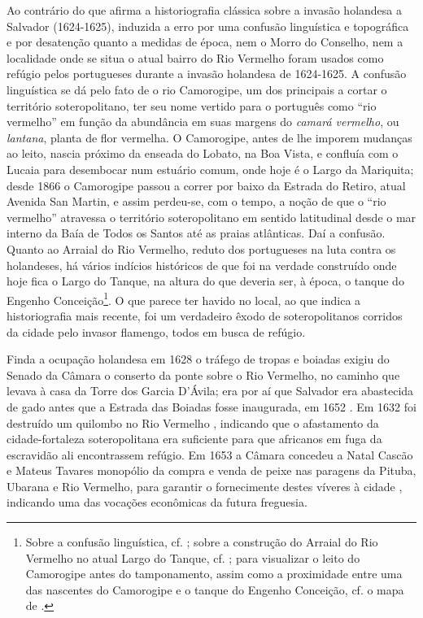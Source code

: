Ao contrário do que afirma a historiografia clássica sobre a invasão holandesa a Salvador (1624-1625), induzida a erro por uma confusão linguística e topográfica e por desatenção quanto a medidas de época, nem o Morro do Conselho, nem a localidade onde se situa o atual bairro do Rio Vermelho foram usados como refúgio pelos portugueses durante a invasão holandesa de 1624-1625. A confusão linguística se dá pelo fato de o rio Camorogipe, um dos principais a cortar o território soteropolitano, ter seu nome vertido para o português como ``rio vermelho'' em função da abundância em suas margens do \textit{camará vermelho}, ou \textit{lantana}, planta de flor vermelha. O Camorogipe, antes de lhe imporem mudanças ao leito, nascia próximo da enseada do Lobato, na Boa Vista, e confluía com o Lucaia para desembocar num estuário comum, onde hoje é o Largo da Mariquita; desde 1866 o Camorogipe passou a correr por baixo da Estrada do Retiro, atual Avenida San Martin, e assim perdeu-se, com o tempo, a noção de que o ``rio vermelho'' atravessa o território soteropolitano em sentido latitudinal desde o mar interno da Baía de Todos os Santos até as praias atlânticas. Daí a confusão. Quanto ao Arraial do Rio Vermelho, reduto dos portugueses na luta contra os holandeses, há vários indícios históricos de que foi na verdade construído onde hoje fica o Largo do Tanque, na altura do que deveria ser, à época, o tanque do Engenho Conceição\footnote{Sobre a confusão linguística, cf. ; sobre a construção do Arraial do Rio Vermelho no atual Largo do Tanque, cf. ; para visualizar o leito do Camorogipe antes do tamponamento, assim como a proximidade entre uma das nascentes do Camorogipe e o tanque do Engenho Conceição, cf. o mapa de .}. O que parece ter havido no local, ao que indica a historiografia mais recente, foi um verdadeiro êxodo de soteropolitanos corridos da cidade pelo invasor flamengo, todos em busca de refúgio.

Finda a ocupação holandesa em 1628 o tráfego de tropas e boiadas exigiu do Senado da Câmara o conserto da ponte sobre o Rio Vermelho, no caminho que levava à casa da Torre dos Garcia D'Ávila; era por aí que Salvador era abastecida de gado antes que a Estrada das Boiadas fosse inaugurada, em 1652 \cite[pp.~315-316]{azevedo_povoamento_1969}. Em 1632 foi destruído um quilombo no Rio Vermelho \cite[p.~67]{VASCONCELOS2002}, indicando que o afastamento da cidade-fortaleza soteropolitana era suficiente para que africanos em fuga da escravidão ali encontrassem refúgio. Em 1653 a Câmara concedeu a Natal Cascão e Mateus Tavares monopólio da compra e venda de peixe nas paragens da Pituba, Ubarana e Rio Vermelho, para garantir o fornecimente destes víveres à cidade \cite[p.~259]{azevedo_povoamento_1969}, indicando uma das vocações econômicas da futura freguesia.

